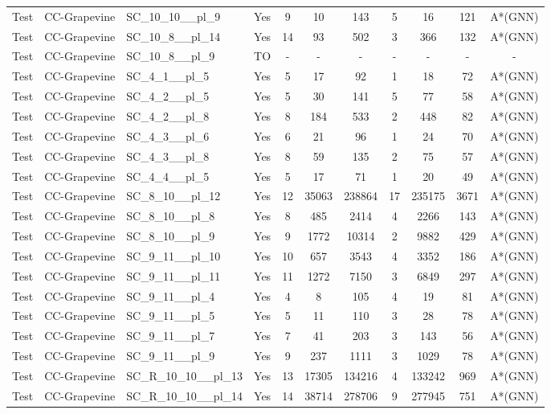 \documentclass{article}
\begin{document}
\begin{tabular}{lllcccccccc}
Test & CC-Grapevine & SC\_10\_10\_\_pl\_9 & Yes & 9 & 10 & 143 & 5 & 16 & 121 & A*(GNN) \\
Test & CC-Grapevine & SC\_10\_8\_\_pl\_14 & Yes & 14 & 93 & 502 & 3 & 366 & 132 & A*(GNN) \\
Test & CC-Grapevine & SC\_10\_8\_\_pl\_9 & TO & - & - & - & - & - & - & - \\
Test & CC-Grapevine & SC\_4\_1\_\_pl\_5 & Yes & 5 & 17 & 92 & 1 & 18 & 72 & A*(GNN) \\
Test & CC-Grapevine & SC\_4\_2\_\_pl\_5 & Yes & 5 & 30 & 141 & 5 & 77 & 58 & A*(GNN) \\
Test & CC-Grapevine & SC\_4\_2\_\_pl\_8 & Yes & 8 & 184 & 533 & 2 & 448 & 82 & A*(GNN) \\
Test & CC-Grapevine & SC\_4\_3\_\_pl\_6 & Yes & 6 & 21 & 96 & 1 & 24 & 70 & A*(GNN) \\
Test & CC-Grapevine & SC\_4\_3\_\_pl\_8 & Yes & 8 & 59 & 135 & 2 & 75 & 57 & A*(GNN) \\
Test & CC-Grapevine & SC\_4\_4\_\_pl\_5 & Yes & 5 & 17 & 71 & 1 & 20 & 49 & A*(GNN) \\
Test & CC-Grapevine & SC\_8\_10\_\_pl\_12 & Yes & 12 & 35063 & 238864 & 17 & 235175 & 3671 & A*(GNN) \\
Test & CC-Grapevine & SC\_8\_10\_\_pl\_8 & Yes & 8 & 485 & 2414 & 4 & 2266 & 143 & A*(GNN) \\
Test & CC-Grapevine & SC\_8\_10\_\_pl\_9 & Yes & 9 & 1772 & 10314 & 2 & 9882 & 429 & A*(GNN) \\
Test & CC-Grapevine & SC\_9\_11\_\_pl\_10 & Yes & 10 & 657 & 3543 & 4 & 3352 & 186 & A*(GNN) \\
Test & CC-Grapevine & SC\_9\_11\_\_pl\_11 & Yes & 11 & 1272 & 7150 & 3 & 6849 & 297 & A*(GNN) \\
Test & CC-Grapevine & SC\_9\_11\_\_pl\_4 & Yes & 4 & 8 & 105 & 4 & 19 & 81 & A*(GNN) \\
Test & CC-Grapevine & SC\_9\_11\_\_pl\_5 & Yes & 5 & 11 & 110 & 3 & 28 & 78 & A*(GNN) \\
Test & CC-Grapevine & SC\_9\_11\_\_pl\_7 & Yes & 7 & 41 & 203 & 3 & 143 & 56 & A*(GNN) \\
Test & CC-Grapevine & SC\_9\_11\_\_pl\_9 & Yes & 9 & 237 & 1111 & 3 & 1029 & 78 & A*(GNN) \\
Test & CC-Grapevine & SC\_R\_10\_10\_\_pl\_13 & Yes & 13 & 17305 & 134216 & 4 & 133242 & 969 & A*(GNN) \\
Test & CC-Grapevine & SC\_R\_10\_10\_\_pl\_14 & Yes & 14 & 38714 & 278706 & 9 & 277945 & 751 & A*(GNN) \\

\end{tabular}
\end{document}
